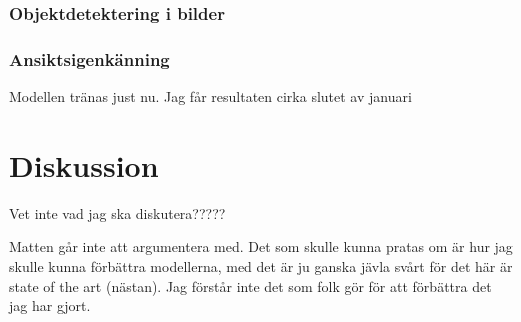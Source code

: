 \documentclass[a4paper,11pt,twoside]{article}
\begin{document}
\subsubsection{Objektdetektering i bilder}

\subsubsection{Ansiktsigenkänning}
Modellen tränas just nu. Jag får resultaten cirka slutet av januari

\section{Diskussion}
Vet inte vad jag ska diskutera?????

Matten går inte att argumentera med. Det som skulle kunna pratas om är hur jag skulle kunna förbättra modellerna, med det är ju ganska jävla svårt för det här är state of the art (nästan). Jag förstår inte det som folk gör för att förbättra det jag har gjort.
\end{document}
